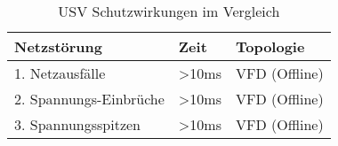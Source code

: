 \begin{table}[ht]
 \centering
		\begin{tabular}{| p{6.5cm} | p{2.5cm} | p{4.0cm} |}
		\hline
		
		\textbf{Netzstörung} 						& \textbf{Zeit} 		& \textbf{Topologie}\\
		\hline
		1. Netzausfälle									& \textgreater 10ms & VFD (Offline)\\
		\hline
		2. Spannungs-Einbrüche					& \textgreater 10ms & VFD (Offline)\\
		\hline
		3. Spannungsspitzen							& \textgreater 10ms & VFD (Offline)\\
		\hline
		
		\end{tabular}
	\caption[USV Schutzwirkungen im Vergleich]{USV Schutzwirkungen im Vergleich \cite{tabelle}}
	\label{tab:VergleichUSV}
\end{table}


\nocite{Solvin}